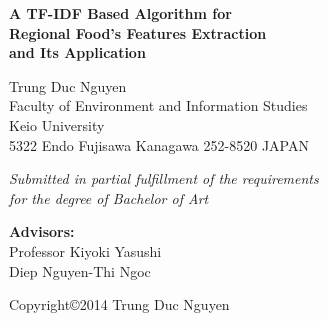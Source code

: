 \documentclass[12pt,a4j]{report}
\begin{document}
\thispagestyle{empty}
\parindent=1pt

\begin{center}

\vspace{30mm}

{\Large\bf A TF-IDF Based Algorithm for  }\\ 
{\Large\bf Regional Food's Features Extraction }\\
{\Large\bf and Its Application}\\
\vspace{3mm}

\vspace{10mm}

{\LARGE Trung Duc Nguyen }\\
\vspace{10mm}
{\Large Faculty of Environment and Information Studies}\\
\vspace{5mm}
{\LARGE Keio University}\\
\vspace{5mm}
{\Large 5322 Endo Fujisawa Kanagawa 252-8520}
{\Large JAPAN}\\
\vspace{10mm}

{\Large\it  Submitted in partial fulfillment of the requirements} \\
\vspace{3mm}
{\Large\it  for the degree of Bachelor of Art}\\

\vspace{12mm}

\textbf{{\Large Advisors:}}\\
\vspace{5mm}
{\Large Professor Kiyoki Yasushi}\\
\vspace{2mm}
{\Large Diep Nguyen-Thi Ngoc}\\
\vspace{2mm}


\vspace{12mm}

{\large Copyright\copyright  2014 Trung Duc Nguyen}

\end{center}
\end{document}
